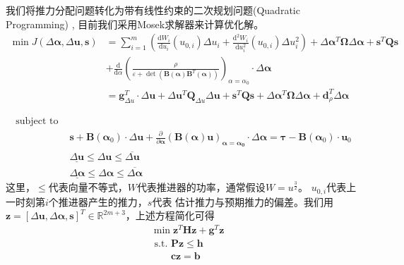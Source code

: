 我们将推力分配问题转化为带有线性约束的二次规划问题(Quadratic Programming)
\cite{johansen2004constrained}, 目前我们采用Mosek求解器来计算优化解。
\begin{equation}
  \label{eq:qpmin}
    \begin{aligned}
      \min J(\Delta \bm{\alpha}, \Delta \bm{u}, \bm{s})
      &= \sum_{i=1}^{m} \left(
      \frac{\mathrm{d} W_{i}}{\mathrm{d} u_{i}}\left( u_{0, i} \right)
      \Delta u_{i}+
      \frac{\mathrm{d}^{2} W_{i}}{\mathrm{d} u_{i}^{2}}\left(u_{0, i}\right)
      \Delta u_{i}^{2} \right)+
      \Delta \bm{\alpha}^{T} \bm{\Omega} \Delta \bm{\alpha}+\bm{s}^{T} \bm{Q} \bm{s} \\
      &+\frac{\mathrm{d}}{\mathrm{d}\alpha}\left(\frac{\rho}{\varepsilon+
      \operatorname{det}\left(\bm{B}(\bm{\alpha})\bm{B}^{T}(\bm{\alpha})\right)}\right)
      _{\alpha=\alpha_{0}} \cdot \Delta \bm{\alpha} \\
      &=\bm{g}_{\Delta u}^{T} \cdot \Delta \bm{u}+\Delta \bm{u}^{T} \bm{Q}_{\Delta u}
      \Delta \bm{u}+\bm{s}^{T} \bm{Q} \bm{s}+\Delta \bm{\alpha}^{T}
      \bm{\Omega} \Delta \bm{\alpha}+\bm{d}_{\rho}^{T} \Delta \bm{\alpha}
    \end{aligned}
\end{equation}

\begin{equation}
  \label{eq:qpconstraints}
    \begin{aligned}
      \text{subject to } \\
      &\bm{s}+\bm{B}\left(\bm{\alpha}_{0}\right) \cdot \Delta \bm{u}+
      \frac{\partial}{\partial \bm{\alpha}}(\bm{B}(\bm{\alpha}) \bm{u})
      _{\bm{\alpha}=\bm{\alpha_{0}}} \cdot \Delta \bm{\alpha}
      =\bm{\tau}-\bm{B}\left(\bm{\alpha}_{0}\right) \cdot \bm{u}_{0} \\
      &\underline{\Delta \bm{u}} \leq \Delta \bm{u} \leq \overline{\Delta \bm{u}}
      \\ &\underline{\Delta \bm{\alpha}} \leq \Delta \bm{\alpha} \leq \overline{\Delta \bm{\alpha}}
    \end{aligned}
\end{equation}
这里，$\leq$代表向量不等式，$W$代表推进器的功率，通常假设$W=u^{\frac{3}{2}}$。
 $u_{0,i}$代表上一时刻第$i$个推进器产生的推力，$s$代表
估计推力与预期推力的偏差。我们用$\bm{z}=[\Delta \bm{u}, \Delta \bm{\alpha},
\bm{s}]^T \in \mathbb{R}^{2m+3}$，上述方程简化可得
\begin{equation}
  \label{eq:qpsimple}
  \begin{aligned}
  & \min \bm{z}^{T} \bm{H} \bm{z}+\bm{g}^{T} \bm{z} \\
  &\text { s.t. }  \bm{P z} \leq \bm{h} \\
  &\qquad \bm{c z}=\bm{b}
  \end{aligned}
\end{equation}

